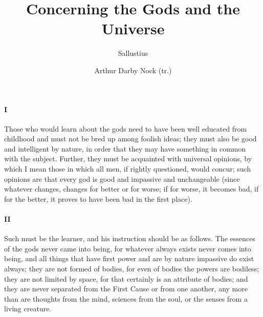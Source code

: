 \documentclass[12pt]{article}
\title{Concerning the Gods and the Universe}
\author{Sallustius \and Arthur Darby Nock (tr.)}
\date{}
\begin{document}
\maketitle

\paragraph{I} Those who would learn about the gods need to have been
well educated from childhood and must not be bred up
among foolish ideas; they must also be good and intelligent
by nature, in order that they may have something in common
with the subject. Further, they must be acquainted with
universal opinions, by which I mean those in which all men,
if rightly questioned, would concur; such opinions are that
every god is good and impassive and unchangeable (since
whatever changes, changes for better or for worse; if for
worse, it becomes bad, if for the better, it proves to have been
bad in the first place).

\paragraph{II} Such must be the learner, and his
instruction should be as follows. The essences of the gods
never came into being, for whatever always exists never
comes into being, and all things that have first power and
are by nature impassive do exist always; they are not formed
of bodies, for even of bodies the powers are bodiless; they
are not limited by space, for that certainly is an attribute
of bodies; and they are never separated from the First Cause
or from one another, any more than are thoughts from the
mind, sciences from the soul, or the senses from a living
creature.
\end{document}
